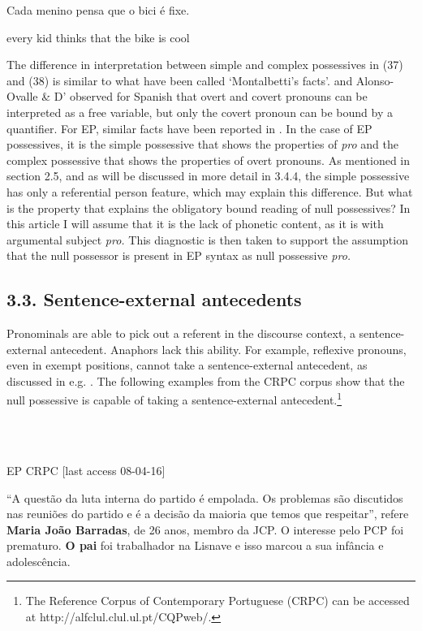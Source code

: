 \documentclass[output=paper]{langsci/langscibook}
\begin{document}
Cada menino pensa que o bici é fixe.

every kid thinks that the bike is cool

The difference in interpretation between simple and complex possessives in (37) and (38) is similar to what have been called ‘Montalbetti’s facts’. \citet{Montalbetti1984} and Alonso-Ovalle \& D’\citet{Introno2001} observed for Spanish that overt and covert pronouns can be interpreted as a free variable, but only the covert pronoun can be bound by a quantifier. For EP, similar facts have been reported in \citet{Lobo2013}. In the case of EP possessives, it is the simple possessive that shows the properties of \textit{pro} and the complex possessive that shows the properties of overt pronouns. As mentioned in section 2.5, and as will be discussed in more detail in 3.4.4, the simple possessive has only a referential person feature, which may explain this difference. But what is the property that explains the obligatory bound reading of null possessives? In this article I will assume that it is the lack of phonetic content, as it is with argumental subject \textit{pro.} This diagnostic is then taken to support the assumption that the null possessor is present in EP syntax as null possessive \textit{pro.}

\subsection{ 3.3. Sentence-external antecedents}

Pronominals are able to pick out a referent in the discourse context, a sentence-external antecedent. Anaphors lack this ability. For example, reflexive pronouns, even in exempt positions, cannot take a sentence-external antecedent, as discussed in e.g. \citet{Campos1995}. The following examples from the CRPC corpus show that the null possessive is capable of taking a sentence-external antecedent.\footnote{The Reference Corpus of Contemporary Portuguese (CRPC) can be accessed at http://alfclul.clul.ul.pt/CQPweb/.}

\ea%
    \label{ex:key:40}
    \gll\\
        \\
    \glt
    \z

          EP   CRPC [last access 08-04-16]

“A questão da luta interna do partido é empolada. Os problemas são discutidos nas reuniões do partido e é a decisão da maioria que temos que respeitar”, refere \textbf{Maria João Barradas}, de 26 anos, membro da JCP. O interesse pelo PCP foi prematuro. \textbf{O pai} foi trabalhador na Lisnave e isso marcou a sua infância e adolescência.
\end{document}
